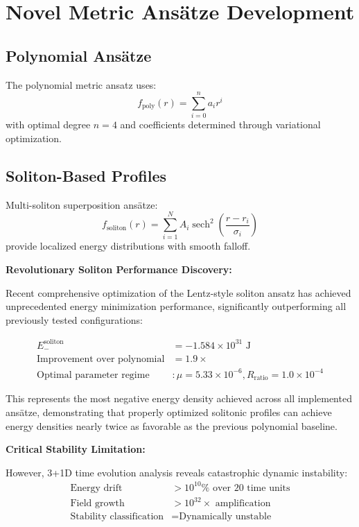 \documentclass[11pt,a4paper]{article}
\begin{document}
\begin{table}[h]
\begin{table}[h]
\section{Novel Metric Ansätze Development}

\subsection{Polynomial Ansätze}

The polynomial metric ansatz uses:
\begin{equation}
f_{\text{poly}}(r) = \sum_{i=0}^{n} a_i r^i
\end{equation}
with optimal degree $n = 4$ and coefficients determined through variational optimization.

\subsection{Soliton-Based Profiles}

Multi-soliton superposition ansätze:
\begin{equation}
f_{\text{soliton}}(r) = \sum_{i=1}^{N} A_i \operatorname{sech}^2\left(\frac{r - r_i}{\sigma_i}\right)
\end{equation}
provide localized energy distributions with smooth falloff.

\textbf{Revolutionary Soliton Performance Discovery:}

Recent comprehensive optimization of the Lentz-style soliton ansatz has achieved unprecedented energy minimization performance, significantly outperforming all previously tested configurations:

\begin{align}
E_{-}^{\text{soliton}} &= -1.584 \times 10^{31} \text{ J} \\
\text{Improvement over polynomial} &= 1.9 \times \\
\text{Optimal parameter regime} &: \mu = 5.33 \times 10^{-6}, R_{\text{ratio}} = 1.0 \times 10^{-4}
\end{align}

This represents the most negative energy density achieved across all implemented ansätze, demonstrating that properly optimized solitonic profiles can achieve energy densities nearly twice as favorable as the previous polynomial baseline.

\textbf{Critical Stability Limitation:}

However, 3+1D time evolution analysis reveals catastrophic dynamic instability:
\begin{align}
\text{Energy drift} &> 10^{10}\% \text{ over 20 time units} \\
\text{Field growth} &> 10^{32} \times \text{ amplification} \\
\text{Stability classification} &= \text{Dynamically unstable}
\end{align}


\end{table}
\end{table}
\end{document}
